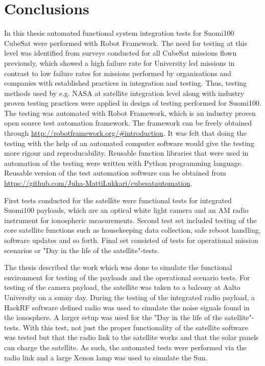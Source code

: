 \documentclass[english,12pt,a4paper,pdftex,elec,utf8]{aaltothesis}
\begin{document}


\clearpage

\section{Conclusions} 
In this thesis automated functional system integration tests for Suomi100 CubeSat were performed with Robot Framework. The need for testing at this level was identified from surveys conducted for all CubeSat missions flown previously, which showed a high failure rate for University led missions in contrast to low failure rates for missions performed by organisations and companies with established practices in integration and testing. Thus, testing methods used by e.g. NASA at satellite integration level along with industry proven testing practices were applied in design of testing performed for Suomi100. The testing was automated with Robot Framework, which is an industry proven open source test automation framework. The framework can be freely obtained through \url{http://robotframework.org/#introduction}. It was felt that doing the testing with the help of an automated computer software would give the testing more rigour and reproducability. Reusable function libraries that were used in automation of the testing were written with Python programming language. Reusable version of the test automation software can be obtained from \url{https://github.com/Juha-MattiLukkari/cubesatautomation}.\par
First tests conducted for the satellite were functional tests for integrated Suomi100 payloads, which are an optical white light camera and an AM radio instrument for ionospheric measurements. Second test set included testing of the core satellite functions  such as housekeeping data collection, safe reboot handling, software updates and so forth. Final set consisted of tests for operational mission scenarios or "Day in the life of the satellite"-tests.\par 
The thesis described the work which was done to simulate the functional environment for testing of the payloads and the operational scenario tests. For testing of the camera payload, the satellite was taken to a balcony at Aalto University on a sunny day. During the testing of the integrated radio payload,  a HackRF software defined radio was used to simulate the noise signals found in the ionosphere. A larger setup was used for the "Day in the life of the satellite"-tests. With this test, not just the proper functionality of the satellite software was tested but that the radio link to the satellite works and that the solar panels can charge the satellite. As such, the automated tests were performed via the radio link and a large Xenon lamp was used to simulate the Sun.\par 
\end{document}
